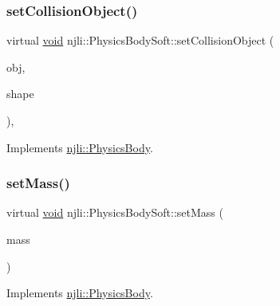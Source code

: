 \subsubsection{\texorpdfstring{set\+Collision\+Object()}{setCollisionObject()}}
{\footnotesize\ttfamily virtual \mbox{\hyperlink{_thread_8h_af1e856da2e658414cb2456cb6f7ebc66}{void}} njli\+::\+Physics\+Body\+Soft\+::set\+Collision\+Object (\begin{DoxyParamCaption}\item[{const bt\+Collision\+Object \&}]{obj,  }\item[{\mbox{\hyperlink{classnjli_1_1_physics_shape}{Physics\+Shape}} $\ast$}]{shape }\end{DoxyParamCaption})\hspace{0.3cm}{\ttfamily [protected]}, {\ttfamily [virtual]}}



Implements \mbox{\hyperlink{classnjli_1_1_physics_body_a674974f0df3db645620c7156177659ee}{njli\+::\+Physics\+Body}}.

\mbox{\label{classnjli_1_1_physics_body_soft_a23766e4c1a649a93680f37592cd56060}} 
\subsubsection{\texorpdfstring{set\+Mass()}{setMass()}}
{\footnotesize\ttfamily virtual \mbox{\hyperlink{_thread_8h_af1e856da2e658414cb2456cb6f7ebc66}{void}} njli\+::\+Physics\+Body\+Soft\+::set\+Mass (\begin{DoxyParamCaption}\item[{\mbox{\hyperlink{_util_8h_a5f6906312a689f27d70e9d086649d3fd}{f32}}}]{mass }\end{DoxyParamCaption})\hspace{0.3cm}{\ttfamily [virtual]}}



Implements \mbox{\hyperlink{classnjli_1_1_physics_body_a2418ec20e73cfe304bac23e306daebcd}{njli\+::\+Physics\+Body}}.

\mbox{\label{classnjli_1_1_physics_body_soft_ae0db3e9ff0ab9525f3f1b8e694ce25e5}} 
